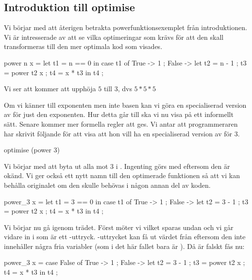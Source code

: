 \documentclass[../Optimise]{subfiles}
\begin{document}
\subsection{Introduktion till optimise}

Vi börjar med att återigen betrakta powerfunktionsexemplet från introduktionen. Vi är
intresserade av att se vilka optimeringar som krävs för att den skall transformeras till den
mer optimala kod som visades.
\begin{codeEx}
power n x = let t1 = n == 0
    in case t1 of
        { True -> 1
        ; False -> let 
            { t2 = n - 1 
            ; t3 = power t2 x
            ; t4 = x * t3
            } in t4
        };
\end{codeEx}
Vi ser att  kommer att upphöja $5$ till $3$, dvs $5 * 5 * 5$

Om vi känner till exponenten men inte basen kan vi göra en specialiserad version av 
för just den exponenten. Hur detta går till ska vi nu visa på ett informellt sätt. 
Senare kommer mer formella regler att ges. Vi antar att programmeraren
har skrivit följande för att visa att hon vill ha en specialiserad version av  för $3$.

\begin{codeEx}
optimise (power 3)
\end{codeEx}

Vi börjar med att byta ut alla  mot $3$ i . Ingenting görs med 
 eftersom den är okänd. Vi ger också ett nytt namn till den optimerade funktionen
så att vi kan behålla originalet om den skulle behövas i någon annan del av koden.
\begin{codeEx}
power_3 x = let t1 = 3 == 0
    in case t1 of
        { True -> 1
        ; False -> let 
            { t2 = 3 - 1 
            ; t3 = power t2 x
            ; t4 = x * t3
            } in t4
        };
\end{codeEx}

Vi börjar nu gå igenom trädet. Först möter vi  vilket 
sparas undan och vi går vidare in i  som är ett -uttryck. 
-uttrycket kan få ut värdet från  eftersom den inte innehåller några 
fria variabler (som i det här fallet bara är ). Då  är falskt fås nu: 

\begin{codeEx}
power_3 x = case False of
    { True -> 1
    ; False -> let 
        { t2 = 3 - 1 
        ; t3 = power t2 x
        ; t4 = x * t3
        } in t4
    };
\end{codeEx}
\end{document}
